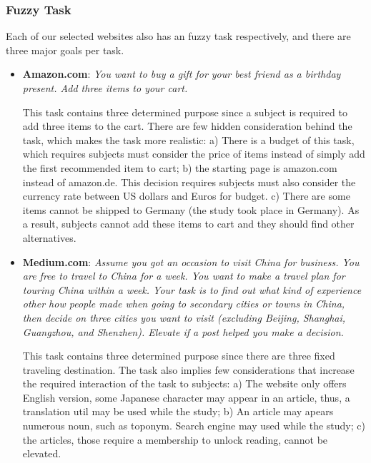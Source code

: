 \subsubsection{Fuzzy Task}

Each of our selected websites also has an fuzzy task respectively, and there are three major goals per task.

\begin{itemize}
    \item \textbf{Amazon.com}: \emph{You want to buy a gift for your best friend as a birthday present.
        Add three items to your cart.}

        This task contains three determined purpose since a subject is required to add three items
        to the cart. There are few hidden consideration behind the task, which makes the task
        more realistic: a) There is a budget of this task, which requires subjects must consider the
        price of items instead of simply add the first recommended item to cart; 
        b) the starting page is amazon.com instead of amazon.de. This decision requires
        subjects must also consider the currency rate between US dollars and Euros for budget.
        c) There are some items cannot be shipped to Germany (the study took place in Germany).
        As a result, subjects cannot add these items to cart and they should find other alternatives.

    \item \textbf{Medium.com}: \emph{Assume you got an occasion to visit China for business. 
        You are free to travel to China for a week. 
        You want to make a travel plan for touring China within a week. Your task is to find out what kind 
        of experience other how people made when going to secondary cities or towns in China, then decide 
        on three cities you want to visit (excluding  Beijing, Shanghai, Guangzhou, and Shenzhen). 
        Elevate if a post helped you make a decision.}

        This task contains three determined purpose since there are three fixed traveling destination.
        The task also implies few considerations that increase the required interaction of the task to subjects:
        a) The website only offers English version, some Japanese character may appear in an article,
        thus, a translation util may be used while the study;
        b) An article may apears numerous noun, such as toponym. Search engine may used while the study;
        c) the articles, those require a membership to unlock reading, cannot be elevated. 



\end{itemize}
